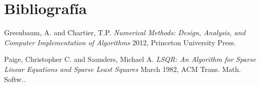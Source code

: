 \documentclass[11pt, spanish]{article}
\begin{document}








\newpage

\lstlistoflistings




\section{Bibliografía}

\begingroup
\renewcommand{\section}[2]{}%
\begin{thebibliography}{}

   Greenbaum, A. and Chartier, T.P. {\em Numerical Methods: Design, Analysis, and Computer Implementation of Algorithms} 2012, Princeton University Press.
  
   Paige, Christopher C. and Saunders, Michael A. {\em LSQR: An Algorithm for Sparse Linear Equations and Sparse Least Squares} March 1982, ACM Trans. Math. Softw..
  
\end{thebibliography}
\endgroup
\newpage

\end{document}
